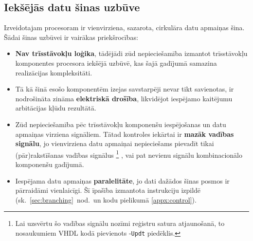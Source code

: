 \subsection{Iekšējās datu šinas uzbūve} \label{sec:databus}
Izveidotajam procesoram ir vienvirziena, sazarota, 
cirkulāra datu apmaiņas šina.
Šādai šinas uzbūvei ir vairākas priekšrocības:
\begin{itemize}
	\item \textbf{Nav trīsstāvokļu loģika}, tādējādi zūd nepieciešamība
		izmantot trīsstāvokļu komponentes procesora iekšējā uzbūvē,
		kas šajā gadījumā samazina realizācijas kompleksitāti.
	\item Tā kā šinā esošo komponentēm izejas savstarpēji nevar tikt
		savienotas, ir nodrošināta zināma \textbf{elektriskā drošība},
		likvidējot iespējamo kaitējumu arbitācijas kļūdu rezultātā.
	\item Zūd nepieciešamība pēc trīsstāvokļu komponenšu iespējošanas un
		datu apmaiņas virziena signāliem. Tātad kontroles iekārtai ir
		\textbf{mazāk vadības signālu}, jo vienvirziena datu
		apmaiņai nepieciešams pievadīt tikai (pār)rakstīšanas vadības signālus%
		\footnote{Lai uzsvērtu šo vadības signālu nozīmi reģistru satura
			atjaunošanā, to nosaukumiem VHDL kodā pievienots -\texttt{Updt} piedēklis.}%
		, vai pat nevienu signālu kombinacionālo komponenšu gadījumā.
	\item Iespējama datu apmaiņas \textbf{paralelitāte}, jo dati dažādos
		šinas posmos ir pārraidāmi vienlaicīgi. Šī īpašība izmantota
		 instrukciju izpildē 
		(sk.~\ref{sec:branching}~nod.~un kodu
		pielikumā \ref{appx:control}).
\end{itemize}

